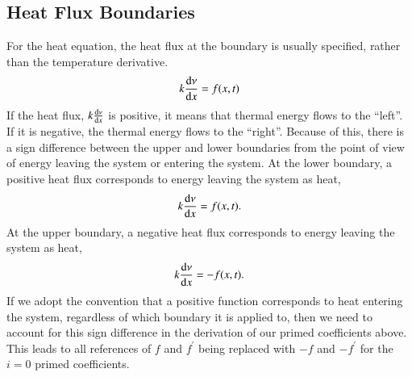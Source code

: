 \documentclass[letterpaper,12pt]{article}
\begin{document}
\subsection{Heat Flux Boundaries}

For the heat equation, the heat flux at the boundary is usually specified, rather than the temperature derivative.
\begin{equation}
  k\dv{\nu}{x} = f(x,t)
\end{equation}
If the heat flux, $k\dv{\nu}{x}$ is positive, it means that thermal energy flows to the ``left''. If it is negative, the thermal
energy flows to the ``right''. Because of this, there is a sign difference between the upper and lower boundaries from the point of view
of energy leaving the system or entering the system. At the lower boundary, a positive heat flux corresponds to energy leaving the system as heat,
\begin{equation}
  k\dv{\nu}{x} = f(x,t).
\end{equation}
At the upper boundary, a negative heat flux corresponds to energy leaving the system as heat,
\begin{equation}
  k\dv{\nu}{x} = -f(x,t).
\end{equation}
If we adopt the convention that a positive function corresponds to heat entering the system, regardless of which boundary it
is applied to, then we need to account for this sign difference in the derivation of our primed coefficients above. This leads
to all references of $f$ and $f^\prime$ being replaced with $-f$ and $-f^\prime$ for the $i = 0$ primed coefficients.
\end{document}
